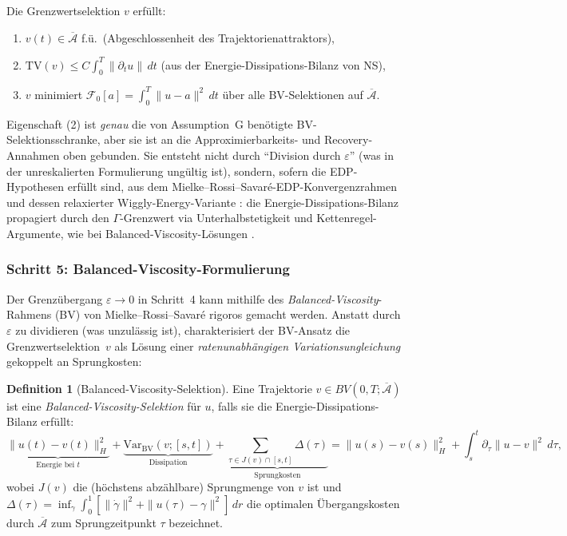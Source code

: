 \documentclass[12pt,a4paper]{article}
\theoremstyle{definition}
\newtheorem{definition}{Definition}[section]
\theoremstyle{plain}
\theoremstyle{remark}
\begin{document}
Die Grenzwertselektion $v$ erf\"ullt:
\begin{enumerate}
\item $v(t) \in \overline{\mathcal{A}}$ f.\"u.\ (Abgeschlossenheit des Trajektorienattraktors),
\item $\mathrm{TV}(v) \leq C \int_0^T \|\partial_t u\| \, dt$ (aus der Energie-Dissipations-Bilanz von NS),
\item $v$ minimiert $\mathcal{F}_0[a] = \int_0^T \|u - a\|^2\,dt$ \"uber alle BV-Selektionen auf $\overline{\mathcal{A}}$.
\end{enumerate}
Eigenschaft (2) ist \emph{genau} die von Assumption~G ben\"otigte BV-Selektionsschranke, aber sie ist an die Approximierbarkeits- und Recovery-Annahmen oben gebunden. Sie entsteht nicht durch ``Division durch $\varepsilon$'' (was in der unreskalierten Formulierung ung\"ultig ist), sondern, sofern die EDP-Hypothesen erfüllt sind, aus dem Mielke--Rossi--Savar\'e-EDP-Konvergenzrahmen \cite{MielkeRossiSavare2016} und dessen relaxierter Wiggly-Energy-Variante \cite{DondlFrenzelMielke2019}: die Energie-Dissipations-Bilanz propagiert durch den $\Gamma$-Grenzwert via Unterhalbstetigkeit und Kettenregel-Argumente, wie bei Balanced-Viscosity-L\"osungen \cite{MielkeRossiSavare2016}.

\subsubsection*{Schritt 5: Balanced-Viscosity-Formulierung}

Der Grenz\"ubergang $\varepsilon \to 0$ in Schritt~4 kann mithilfe des \emph{Balanced-Viscosity}-Rahmens (BV) von Mielke--Rossi--Savar\'e \cite{MielkeRossiSavare2016} rigoros gemacht werden. Anstatt durch $\varepsilon$ zu dividieren (was unzul\"assig ist), charakterisiert der BV-Ansatz die Grenzwertselektion~$v$ als L\"osung einer \emph{ratenunabh\"angigen Variationsungleichung} gekoppelt an Sprungkosten:

\begin{definition}[Balanced-Viscosity-Selektion]\label{def:bv-selection}
Eine Trajektorie $v \in BV(0,T;\overline{\mathcal{A}})$ ist eine \emph{Balanced-Viscosity-Selektion} f\"ur $u$, falls sie die Energie-Dissipations-Bilanz erf\"ullt:
\begin{equation}\label{eq:bv-edb}
  \underbrace{\|u(t) - v(t)\|_H^2}_{\text{Energie bei } t} + \underbrace{\mathrm{Var}_{\mathrm{BV}}(v;[s,t])}_{\text{Dissipation}} + \underbrace{\sum_{\tau \in J(v) \cap [s,t]} \Delta(\tau)}_{\text{Sprungkosten}} = \|u(s) - v(s)\|_H^2 + \int_s^t \partial_\tau \|u - v\|^2 \, d\tau,
\end{equation}
wobei $J(v)$ die (h\"ochstens abz\"ahlbare) Sprungmenge von $v$ ist und $\Delta(\tau) = \inf_\gamma \int_0^1 [\|\dot\gamma\|^2 + \|u(\tau) - \gamma\|^2]\,dr$ die optimalen \"Ubergangskosten durch $\overline{\mathcal{A}}$ zum Sprungzeitpunkt $\tau$ bezeichnet.
\end{definition}
\end{document}
